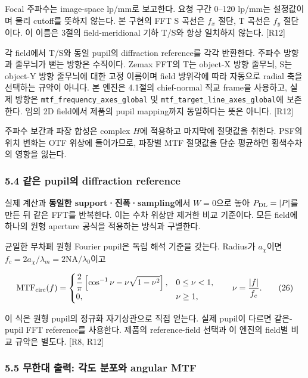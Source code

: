 \documentclass[
  a4paper,
]{article}
\begin{document}
Focal 주파수는 image-space lp/mm로 보고한다. 요청 구간 0--120 lp/mm는
설정값이며 물리 cutoff를 뜻하지 않는다. 본 구현의 FFT S 곡선은 \(f_x\)
절단, T 곡선은 \(f_y\) 절단이다. 이 이름은 3절의 field-meridional 기하
T/S와 항상 일치하지 않는다. {[}R12{]}

각 field에서 T/S와 동일 pupil의 diffraction reference를 각각 반환한다.
주파수 방향과 줄무늬가 뻗는 방향은 수직이다. Zemax FFT의 T는 object-X
방향 줄무늬, S는 object-Y 방향 줄무늬에 대한 고정 이름이며 field 방위각에
따라 자동으로 radial 축을 선택하는 규약이 아니다. 본 엔진은 4.1절의
chief-normal 직교 frame을 사용하고, 실제 방향은
\texttt{mtf\_frequency\_axes\_global} 및
\texttt{mtf\_target\_line\_axes\_global}에 보존한다. 임의 2D field에서
제품의 pupil mapping까지 동일하다는 뜻은 아니다. {[}R12{]}

주파수 보간과 파장 합성은 complex \(H\)에 적용하고 마지막에 절댓값을
취한다. PSF의 위치 변화는 OTF 위상에 들어가므로, 파장별 MTF 절댓값을
단순 평균하면 횡색수차의 영향을 잃는다.

\hypertarget{uxac19uxc740-pupiluxc758-diffraction-reference}{%
\subsubsection{5.4 같은 pupil의 diffraction
reference}\label{uxac19uxc740-pupiluxc758-diffraction-reference}}

실제 계산과 \textbf{동일한 support·진폭·sampling}에서 \(W=0\)으로 놓아
\(P_{\rm DL}=|P|\)를 만든 뒤 같은 FFT를 반복한다. 이는 수차 위상만
제거한 비교 기준이다. 모든 field에 하나의 원형 aperture 공식을 적용하는
방식과 구별한다.

균일한 무차폐 원형 Fourier pupil은 독립 해석 기준을 갖는다. Radius가
\(a_\chi\)이면 \(f_c=2a_\chi/\lambda_m=2\mathrm{NA}/\lambda_0\)이고

\[
\mathrm{MTF}_{\rm circ}(f)=
\begin{cases}
\displaystyle\frac{2}{\pi}\left[\cos^{-1}\nu-\nu\sqrt{1-\nu^2}\right],&0\le\nu<1,\\
0,&\nu\ge1,
\end{cases}
\qquad\nu=\frac{|f|}{f_c}.
\tag{26}
\]

이 식은 원형 pupil의 정규화 자기상관으로 직접 얻는다. 실제 pupil이
다르면 같은-pupil FFT reference를 사용한다. 제품의 reference-field
선택과 이 엔진의 field별 비교 규약은 별도다. {[}R8, R12{]}

\hypertarget{uxbb34uxd55cuxb300-uxcd9cuxb825-uxac01uxb3c4-uxbd84uxd3ecuxc640-angular-mtf}{%
\subsubsection{5.5 무한대 출력: 각도 분포와 angular
MTF}\label{uxbb34uxd55cuxb300-uxcd9cuxb825-uxac01uxb3c4-uxbd84uxd3ecuxc640-angular-mtf}}
\end{document}
